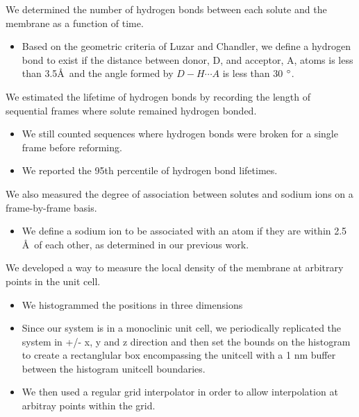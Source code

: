 \documentclass{article}
\begin{document}
  We determined the number of hydrogen bonds between each solute and the membrane
  as a function of time.
  \begin{itemize}
    \item Based on the geometric criteria of Luzar and Chandler, we define a hydrogen
    bond to exist if the distance between donor, D, and acceptor, A, atoms is less 
    than 3.5\AA~and the angle formed by $D-H \cdots A$ is less than 30
    $\degree$.~\cite{luzar_effect_1996}
  \end{itemize}
  
  We estimated the lifetime of hydrogen bonds by recording the length of 
  sequential frames where solute remained hydrogen bonded.
  \begin{itemize}
    \item We still counted sequences where hydrogen bonds were broken for
    a single frame before reforming.
    \item We reported the 95th percentile of hydrogen bond lifetimes.
  \end{itemize}
  
  We also measured the degree of association between solutes and sodium ions on a
  frame-by-frame basis.
  \begin{itemize}
    \item We define a sodium ion to be associated with an atom if they are within 
    2.5 \AA~of each other, as determined in our previous work.~\cite{coscia_chemically_2019}
  \end{itemize}
  
  We developed a way to measure the local density of the membrane at arbitrary
  points in the unit cell.
  \begin{itemize}
    \item We histogrammed the positions in three dimensions
    \item Since our system is in a monoclinic unit cell, we periodically replicated
    the system in +/- x, y and z direction and then set the bounds on the
    histogram to create a rectanglular box encompassing the unitcell with a 1 nm
    buffer between the histogram unitcell boundaries.
    \item We then used a regular grid interpolator in order to allow interpolation
    at arbitray points within the grid.
  \end{itemize}
  
\end{document}
